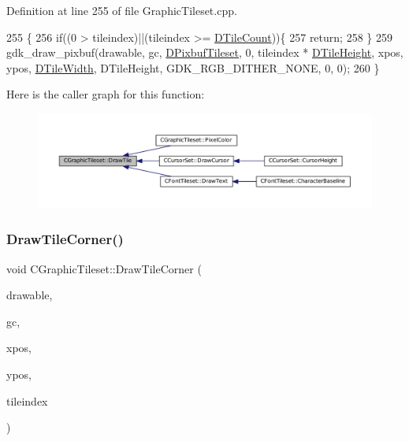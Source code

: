 Definition at line 255 of file Graphic\+Tileset.\+cpp.


\begin{DoxyCode}
255                                                                                                    \{
256     \textcolor{keywordflow}{if}((0 > tileindex)||(tileindex >= \hyperlink{classCGraphicTileset_a39d942b370e47f441bf97385eb1037c8}{DTileCount}))\{
257         \textcolor{keywordflow}{return};
258     \}
259     gdk\_draw\_pixbuf(drawable, gc, \hyperlink{classCGraphicTileset_a5d5adfcdbb347a6df3f57535ca08e3ef}{DPixbufTileset}, 0, tileindex * 
      \hyperlink{classCGraphicTileset_af48f32e07d5fe69afd5f764318cc3244}{DTileHeight}, xpos, ypos, \hyperlink{classCGraphicTileset_a2d0c7d19865b81911a3a43d5cae50e00}{DTileWidth}, DTileHeight, GDK\_RGB\_DITHER\_NONE, 0, 0);
260 \}
\end{DoxyCode}
Here is the caller graph for this function\+:
\nopagebreak
\begin{figure}[H]
\begin{center}
\leavevmode
\includegraphics[width=350pt]{classCGraphicTileset_afefd501a74e95295b7cd2dc868dcbbcb_icgraph}
\end{center}
\end{figure}
\hypertarget{classCGraphicTileset_abf87dd71c8bf50b8878c66a5bdb2c7e7}{}\label{classCGraphicTileset_abf87dd71c8bf50b8878c66a5bdb2c7e7} 
\subsubsection{\texorpdfstring{Draw\+Tile\+Corner()}{DrawTileCorner()}}
{\footnotesize\ttfamily void C\+Graphic\+Tileset\+::\+Draw\+Tile\+Corner (\begin{DoxyParamCaption}\item[{Gdk\+Drawable $\ast$}]{drawable,  }\item[{Gdk\+GC $\ast$}]{gc,  }\item[{gint}]{xpos,  }\item[{gint}]{ypos,  }\item[{int}]{tileindex }\end{DoxyParamCaption})}



